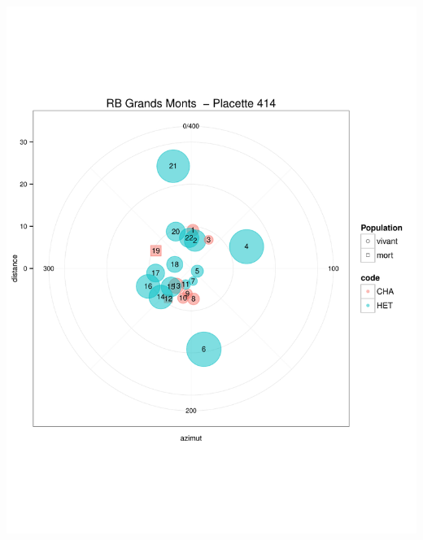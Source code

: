 \documentclass[a4paper]{book}\usepackage[]{graphicx}\usepackage[]{color}
\makeatletter
\def\maxwidth{ %
  \ifdim\Gin@nat@width>\linewidth
    \linewidth
  \else
    \Gin@nat@width
  \fi
}
\newenvironment{knitrout}{}{} %
\makeatother
\begin{document}
\begin{knitrout}
{\centering \includegraphics[width=\maxwidth]{Figures/PlanArbres-35} 

}





\end{knitrout}
\end{document}
